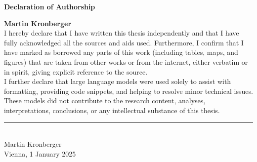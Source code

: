 \vspace*{1cm} %
\begin{center}
    {\LARGE \bfseries Declaration of Authorship}\\[1cm]
\end{center}
\vspace{1cm} %

{\bfseries \noindent Martin Kronberger}\\[0.5cm]

\noindent I hereby declare that I have written this thesis independently and that I have fully acknowledged all the sources and aids used.
Furthermore, I confirm that I have marked as borrowed any parts of this work (including tables, maps, and figures) that are taken from other works or from the internet, either verbatim or in spirit, giving explicit reference to the source.
\\[0.3cm]

\noindent
I further declare that large language models were used solely to assist with formatting, providing code snippets, and helping to resolve minor technical issues.
These models did not contribute to the research content, analyses, interpretations, conclusions, or any intellectual substance of this thesis.

\vfill 

\begin{minipage}[t]{0.5\textwidth}
    \rule[0pt]{6cm}{0.5pt}\\
    Martin Kronberger\\
    Vienna, 1 January 2025
\end{minipage}

\vspace{\fill}
\blankpage
